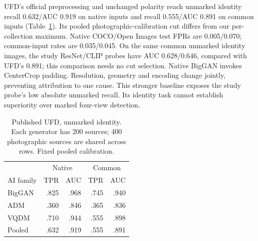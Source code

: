 \documentclass[conference]{IEEEtran}
\begin{document}
UFD's official preprocessing and unchanged polarity reach unmarked identity
recall 0.632/AUC 0.919 on native inputs and recall 0.555/AUC 0.891 on common
inputs (Table~\ref{tab:ufd}). Its pooled photographic-calibration cut differs
from our per-collection maximum. Native COCO/Open Images test FPRs are
0.005/0.070; common-input rates are 0.035/0.045.
On the same common unmarked identity images, the study ResNet/CLIP probes have
AUC 0.628/0.646, compared with UFD's 0.891; this comparison needs no cut selection.
Native BigGAN invokes CenterCrop padding. Resolution, geometry and encoding
change jointly, preventing attribution to one cause. This stronger baseline
exposes the study probe's low absolute unmarked recall.
Its identity task cannot establish superiority over marked four-view detection.

\begin{table}[t]
\caption{Published UFD, unmarked identity. Each generator has 200 sources;
400 photographic sources are shared across rows. Fixed pooled calibration.}
\label{tab:ufd}\centering\footnotesize
\begin{tabular}{lrrrr}\toprule
 & \multicolumn{2}{c}{Native} & \multicolumn{2}{c}{Common}\\
AI family & TPR & AUC & TPR & AUC\\\midrule
BigGAN & .825 & .968 & .745 & .940\\
ADM & .360 & .846 & .365 & .836\\
VQDM & .710 & .944 & .555 & .898\\
Pooled & .632 & .919 & .555 & .891\\
\bottomrule\end{tabular}\end{table}
\end{document}
